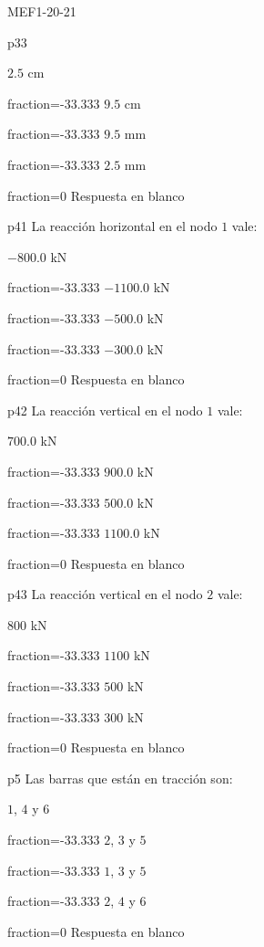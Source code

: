 \documentclass[a4paper]{article}
\begin{document}
\begin{quiz}{MEF1-20-21}
\begin{multi}{p33}
	\item* $2.5$ cm
	\item[fraction=-33.333]  $9.5$ cm
	\item[fraction=-33.333]  $9.5$ mm
	\item[fraction=-33.333]  $2.5$ mm
	\item[fraction=0] Respuesta en blanco
\end{multi}
\begin{multi}{p41}
La reacci\'on horizontal en el nodo $1$ vale:
	\item* $-800.0$ kN
	\item[fraction=-33.333]  $-1100.0$ kN
	\item[fraction=-33.333]  $-500.0$ kN
	\item[fraction=-33.333]  $-300.0$ kN
	\item[fraction=0] Respuesta en blanco
\end{multi}
\begin{multi}{p42}
La reacci\'on vertical en el nodo $1$ vale:
	\item* $700.0$ kN
	\item[fraction=-33.333]  $900.0$ kN
	\item[fraction=-33.333]  $500.0$ kN
	\item[fraction=-33.333]  $1100.0$ kN
	\item[fraction=0] Respuesta en blanco
\end{multi}
\begin{multi}{p43}
La reacci\'on vertical en el nodo $2$ vale:
	\item* $800$ kN
	\item[fraction=-33.333]  $1100$ kN
	\item[fraction=-33.333]  $500$ kN
	\item[fraction=-33.333]  $300$ kN
	\item[fraction=0] Respuesta en blanco
\end{multi}
\begin{multi}{p5}
Las barras que est\'an en tracci\'on son:
	\item* $1$, $4$ y $6$
	\item[fraction=-33.333]  $2$, $3$ y $5$
	\item[fraction=-33.333]  $1$, $3$ y $5$
	\item[fraction=-33.333]  $2$, $4$ y $6$
	\item[fraction=0] Respuesta en blanco

\end{multi}
\end{quiz}
\end{document}
